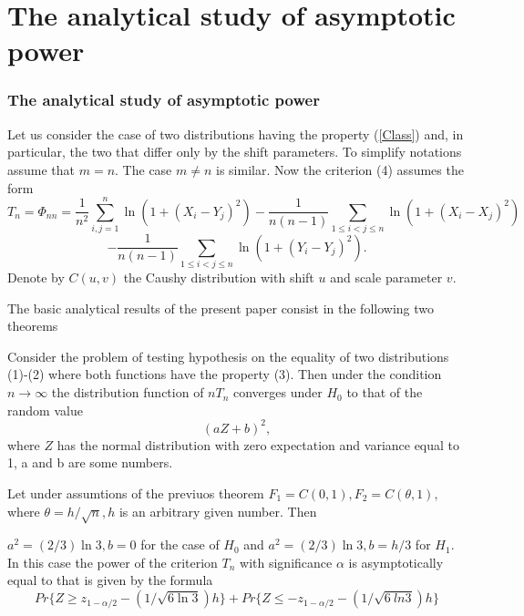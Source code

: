 \documentclass[slidestop,usepdftitle=false]{beamer}
\begin{document}
\section{The analytical study of asymptotic power}
\begin{slide}
\frametitle{The analytical study of asymptotic power}
Let us consider the case of two distributions having the property (\ref{Class}) and, in particular, the two that differ only by the shift parameters. To simplify notations assume that $m=n$. The case $m\ne n$ is similar.
Now the criterion  (4)  assumes the form
\begin{equation}
T_n=\Phi_{nn}= \frac{1}{n^2}\sum_{i,j=1}^n \ln(1 + (X_i - Y_j)^2)-\frac{1}{n(n-1)}\sum_{1\leq i<j\leq n}  \ln(1 + (X_i - X_j)^2)
\end{equation}
\begin{equation}
-  \frac{1}{n(n-1)}\sum_{1\leq i<j\leq n}  \ln(1 + (Y_i - Y_j)^2).
\end{equation}
Denote by $C(u,v)$ the Caushy distribution with shift $u$ and scale parameter $v$.
\end{slide}
\begin{slide}
The basic analytical results of the present paper consist in the following two theorems
\begin{theorem}Consider the problem of testing hypothesis on the equality of two distributions (1)-(2) where both functions have the property (3).
Then under the condition $n \to \infty$
the distribution function of $nT_n$  converges under $H_0$ to that of the random value
\begin{equation*}
(aZ + b)^2,
\end{equation*}
where  $Z$ has the normal distribution with zero expectation and variance equal to 1, a and
b are some numbers.
\end{theorem}
\end{slide}
\begin{slide}
\begin{theorem}
Let under assumtions of the previuos theorem $F_1= C(0,1),F_2=C(\theta,1),$
where
$\theta=h/\sqrt{n},h$ is an arbitrary given number. Then

$a^2 =(2/3)\ln 3, b=0$
for the case of $H_0$ and
$a^2= (2/3)\ln 3, b= h/3$
for  $H_1$.
In this case the power of the criterion $T_n$ with significance $\alpha$ is asymptotically equal to that is given by the formula
$$
Pr\{Z\geq z_{1-\alpha/2}-(1/\sqrt{6\ln 3})h\}
+ Pr\{Z\leq - z_{1-\alpha/2}-(1/\sqrt{6\
ln 3})h\}
$$

\end{theorem}
\end{slide}
\end{document}
